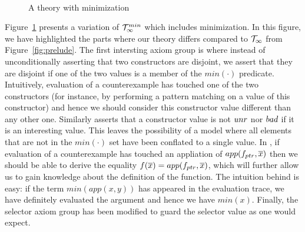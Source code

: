 \begin{figure}
{\[\begin{array}{c}
\begin{array}{lll}
\end{array}
\end{array}\]}
\caption{A theory with minimization}\label{fig:min-theory}
\end{figure}

Figure~\ref{fig:min-theory} presents a variation of ${\cal T}_\infty^{min}$ which includes minimization.
In this figure, we have highlighted the parts where our theory differs compared to ${\cal T}_\infty$ from
Figure~\ref{fig:prelude}. The first intersting axiom group is  where instead of 
unconditionally asserting that two constructors are disjoint, we assert that they are disjoint if
one of the two values is a member of the $min(\cdot)$ predicate. Intuitively, evaluation of a 
counterexample has touched one of the two constructors (for instance, by performing a pattern matching
on a value of this constructor) and hence we should consider this constructor value different than any 
other one. Similarly  asserts that a constructor value is not $\mathop{unr}$ nor $\mathop{bad}$ if 
it is an interesting value. This leaves the possibility of a model where all elements that are not in 
the $min(\cdot)$ set have been conflated to a single value. In , if evaluation of a counterexample
has touched an appliation of $app(f_{ptr},\overline{x})$ then we should be able to derive the equality 
$f(\overline{x}) = app(f_{ptr},\overline{x})$, which will further allow us to gain knowledge about the definition of the function.
The intuition behind  is easy: if the term $min(app(x,y))$ has appeared in the evaluation trace, 
we have definitely evaluated the argument and hence we have $min(x)$. Finally, the selector axiom group 
has been modified to guard the selector value as one would expect.

